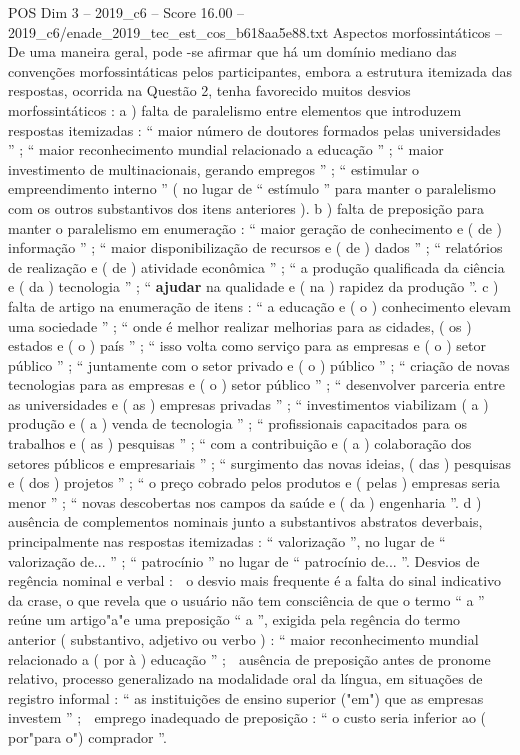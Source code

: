 \begin{textsample}{POS Dim 3 – 2019\_c6 – Score 16.00 – 2019\_c6/enade\_2019\_tec\_est\_cos\_b618aa5e88.txt}
Aspectos morfossintáticos – De uma maneira geral, pode -se afirmar que há um domínio mediano das convenções morfossintáticas pelos participantes, embora a estrutura itemizada das respostas, ocorrida na Questão 2, tenha favorecido muitos desvios morfossintáticos : a ) falta de paralelismo entre elementos que introduzem respostas itemizadas : “ maior número de doutores formados pelas universidades ” ; “ maior reconhecimento mundial relacionado a educação ” ; “ maior investimento de multinacionais, gerando empregos ” ; “ estimular o empreendimento interno ” ( no lugar de “ estímulo ” para manter o paralelismo com os outros substantivos dos itens anteriores ). b ) falta de preposição para manter o paralelismo em enumeração : “ maior geração de conhecimento e ( de ) informação ” ; “ maior disponibilização de recursos e ( de ) dados ” ; “ relatórios de realização e ( de ) atividade econômica ” ; “ a produção qualificada da ciência e ( da ) tecnologia ” ; “ \textbf{ajudar} na qualidade e ( na ) rapidez da produção ”. c ) falta de artigo na enumeração de itens : “ a educação e ( o ) conhecimento elevam uma sociedade ” ; “ onde é melhor realizar melhorias para as cidades, ( os ) estados e ( o ) país ” ; “ isso volta como serviço para as empresas e ( o ) setor público ” ; “ juntamente com o setor privado e ( o ) público ” ; “ criação de novas tecnologias para as empresas e ( o ) setor público ” ; “ desenvolver parceria entre as universidades e ( as ) empresas privadas ” ; “ investimentos viabilizam ( a ) produção e ( a ) venda de tecnologia ” ; “ profissionais capacitados para os trabalhos e ( as ) pesquisas ” ; “ com a contribuição e ( a ) colaboração dos setores públicos e empresariais ” ; “ surgimento das novas ideias, ( das ) pesquisas e ( dos ) projetos ” ; “ o preço cobrado pelos produtos e ( pelas ) empresas seria menor ” ; “ novas descobertas nos campos da saúde e ( da ) engenharia ”. d ) ausência de complementos nominais junto a substantivos abstratos deverbais, principalmente nas respostas itemizadas : “ valorização ”, no lugar de “ valorização de... ” ; “ patrocínio ” no lugar de “ patrocínio de... ”.
Desvios de regência nominal e verbal :  o desvio mais frequente é a falta do sinal indicativo da crase, o que revela que o usuário não tem consciência de que o termo “ a ” reúne um artigo"a"e uma preposição “ a ”, exigida pela regência do termo anterior ( substantivo, adjetivo ou verbo ) : “ maior reconhecimento mundial relacionado a ( por à ) educação ” ;  ausência de preposição antes de pronome relativo, processo generalizado na modalidade oral da língua, em situações de registro informal : “ as instituições de ensino superior ("em") que as empresas investem ” ;  emprego inadequado de preposição : “ o custo seria inferior ao ( por"para o") comprador ”.

\end{textsample}
